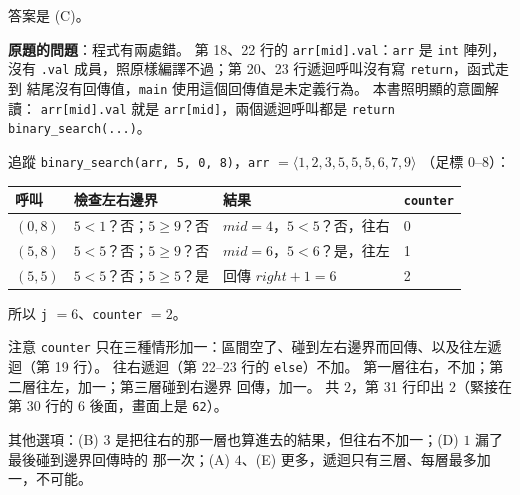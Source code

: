 \begin{pastsoln}
答案是 (C)。

\textbf{原題的問題}：程式有兩處錯。 第 18、22 行的 \texttt{arr[mid].val}：\texttt{arr} 是 \texttt{int}
陣列，沒有 \texttt{.val} 成員，照原樣編譯不過；第 20、23 行遞迴呼叫沒有寫 \texttt{return}，函式走到
結尾沒有回傳值，\texttt{main} 使用這個回傳值是未定義行為。 本書照明顯的意圖解讀：
\texttt{arr[mid].val} 就是 \texttt{arr[mid]}，兩個遞迴呼叫都是 \texttt{return binary\_search(...)}。

追蹤 \texttt{binary\_search(arr, 5, 0, 8)}，\texttt{arr} $= \langle 1, 2, 3, 5, 5, 5, 6, 7, 9\rangle$
（足標 $0$--$8$）：
\begin{center}
\small
\begin{tabular}{llll}
\toprule
呼叫 & 檢查左右邊界 & 結果 & \texttt{counter} \\
\midrule
$(0, 8)$ & $5 < 1$？否；$5 \ge 9$？否 & $\mathit{mid} = 4$，$5 < 5$？否，往右 & 0 \\
$(5, 8)$ & $5 < 5$？否；$5 \ge 9$？否 & $\mathit{mid} = 6$，$5 < 6$？是，往左 & 1 \\
$(5, 5)$ & $5 < 5$？否；$5 \ge 5$？是 & 回傳 $\mathit{right} + 1 = 6$ & 2 \\
\bottomrule
\end{tabular}
\end{center}
所以 \texttt{j} $= 6$、\texttt{counter} $= 2$。

注意 \texttt{counter} 只在三種情形加一：區間空了、碰到左右邊界而回傳、以及往左遞迴（第 19 行）。
往右遞迴（第 22--23 行的 \texttt{else}）不加。 第一層往右，不加；第二層往左，加一；第三層碰到右邊界
回傳，加一。 共 $2$，第 31 行印出 $2$（緊接在第 30 行的 $6$ 後面，畫面上是 \texttt{62}）。

其他選項：(B) $3$ 是把往右的那一層也算進去的結果，但往右不加一；(D) $1$ 漏了最後碰到邊界回傳時的
那一次；(A) $4$、(E) 更多，遞迴只有三層、每層最多加一，不可能。
\end{pastsoln}
